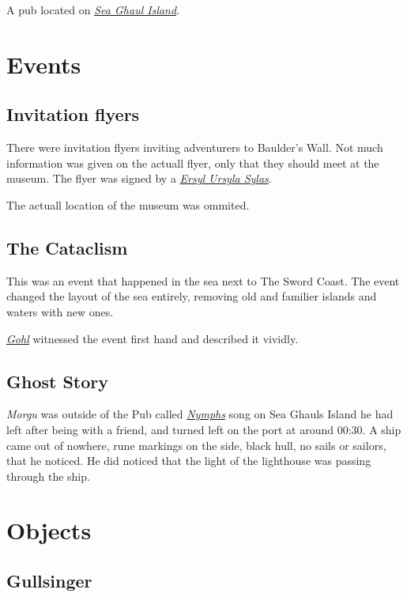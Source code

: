 \documentclass{article}
\begin{document}
\begin{multicols}{2}
    A pub located on \hyperref[sea_ghaul_island]{\textit{Sea Ghaul Island}}.

    \section{Events}
    \label{events}

    \subsection{Invitation flyers}
    \label{invitation}

    There were invitation flyers inviting adventurers to Baulder's Wall. Not much information was given on the actuall flyer, only that they should meet at the museum. The flyer was signed by a
    \hyperref[ersyl]{\textit{Ersyl Ursyla Sylas}}.

    The actuall location of the museum was ommited.

    \subsection{The Cataclism}
    \label{cataclism}

    This was an event that happened in the sea next to The Sword Coast. The event changed the layout of the sea entirely, removing old and familier islands and waters with new ones.

    \hyperref[gohl]{\textit{Gohl}} witnessed the event first hand and described it vividly.

    \subsection{Ghost Story}
    \label{ghost_story}

    \textit{Morgu} was outside of the Pub called \hyperref[nymphs]{\textit{Nymphs}} song on Sea Ghauls Island he had left after being with a friend, and turned left on the port at around 00:30. A ship came out of
    nowhere, rune markings on the side, black hull, no sails or sailors, that he noticed. He did noticed that the light of the lighthouse was passing through the ship.

    \section{Objects}
    \label{objects}

    \subsection{Gullsinger}
    \label{gullsinger}


\end{multicols}
\end{document}
